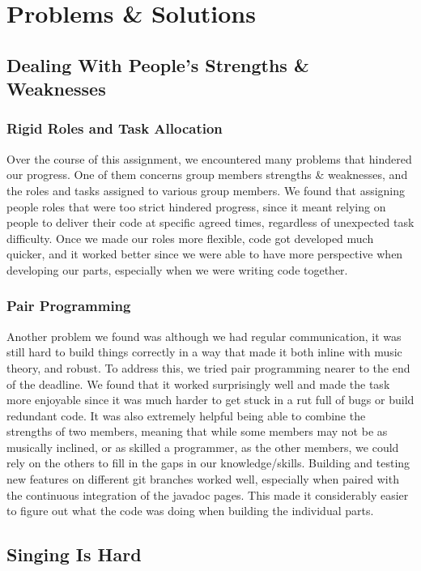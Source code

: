 \documentclass[10pt,a4paper]{article}
\begin{document}
\section{Problems \& Solutions}
\subsection{Dealing With People's Strengths \& Weaknesses}
\subsubsection{Rigid Roles and Task Allocation}
Over the course of this assignment, we encountered many problems that hindered our progress. One of them concerns group members strengths \& weaknesses, and the roles and tasks assigned to various group members. We found that assigning people roles that were too strict hindered progress, since it meant relying on people to deliver their code at specific agreed times, regardless of unexpected task difficulty. Once we made our roles more flexible, code got developed much quicker, and it worked better since we were able to have more perspective when developing our parts, especially when we were writing code together. 
\subsubsection{Pair Programming}
Another problem we found was although we had regular communication, it was still hard to build things correctly in a way that made it both inline with music theory, and robust. To address this, we tried pair programming nearer to the end of the deadline. We found that it worked surprisingly well and made the task more enjoyable since it was much harder to get stuck in a rut full of bugs or build redundant code. It was also extremely helpful being able to combine the strengths of two members, meaning that while some members may not be as musically inclined, or as skilled a programmer, as the other members, we could rely on the others to fill in the gaps in our knowledge/skills. Building and testing new features on different git branches worked well, especially when paired with the continuous integration of the javadoc pages. This made it considerably easier to figure out what the code was doing when building the individual parts. 

\subsection{Singing Is Hard}
\end{document}
